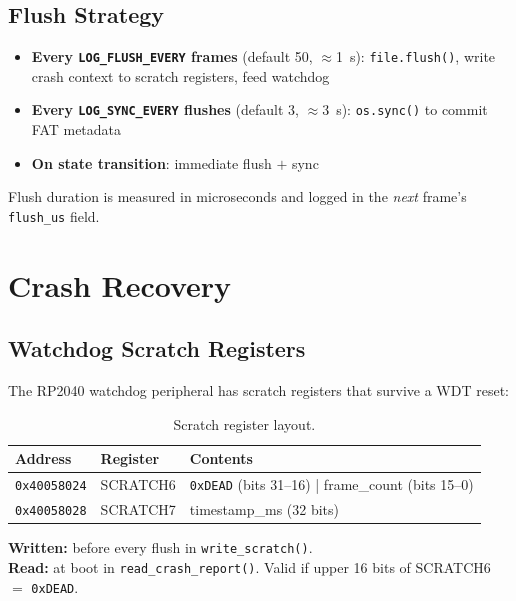 \documentclass[11pt, a4paper, twoside]{article}
\newcommand{\hex}[1]{\texttt{0x#1}}
\newcommand{\config}[1]{\texttt{#1}}
\begin{document}
\subsection{Flush Strategy}
\label{sec:flush}

\begin{itemize}
    \item \textbf{Every \config{LOG\_FLUSH\_EVERY} frames} (default 50, $\approx$\SI{1}{\second}): \texttt{file.flush()}, write crash context to scratch registers, feed watchdog
    \item \textbf{Every \config{LOG\_SYNC\_EVERY} flushes} (default 3, $\approx$\SI{3}{\second}): \texttt{os.sync()} to commit FAT metadata
    \item \textbf{On state transition}: immediate flush $+$ sync
\end{itemize}

Flush duration is measured in microseconds and logged in the \textit{next} frame's \texttt{flush\_us} field.

\section{Crash Recovery}
\label{sec:crash-recovery}

\subsection{Watchdog Scratch Registers}

The RP2040 watchdog peripheral has scratch registers that survive a WDT reset:

\begin{table}[ht]
\centering
\caption{Scratch register layout.}
\label{tab:scratch}
\begin{tabular}{l l l}
\toprule
\textbf{Address} & \textbf{Register} & \textbf{Contents} \\
\midrule
\texttt{0x40058024} & SCRATCH6 & \texttt{0xDEAD} (bits 31--16) | frame\_count (bits 15--0) \\
\texttt{0x40058028} & SCRATCH7 & timestamp\_ms (32 bits) \\
\bottomrule
\end{tabular}
\end{table}

\textbf{Written:} before every flush in \texttt{write\_scratch()}.\\
\textbf{Read:} at boot in \texttt{read\_crash\_report()}. Valid if upper 16 bits of SCRATCH6 $=$ \hex{DEAD}.
\end{document}
